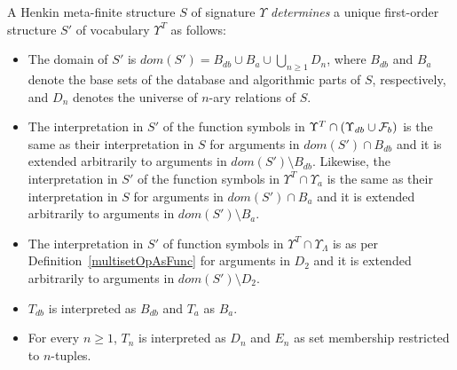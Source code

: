 \documentclass[preprint,11pt]{elsarticle}
\theoremstyle{definition}
\theoremstyle{remark}
\begin{document}
A Henkin meta-finite structure $S$ of signature $\Upsilon$ \emph{determines} a unique first-order structure $S'$ of vocabulary $\Upsilon^T$ as follows:

\begin{itemize}
\item The domain of $S'$ is $\mathit{dom}(S') = B_{db} \cup B_{a} \cup \bigcup_{n \geq 1} D_n$, where $B_{db}$ and $B_a$ denote the base sets of the database and algorithmic parts of $S$, respectively, and $D_n$ denotes the universe of $n$-ary relations of $S$. 
\item The interpretation in $S'$ of the function symbols in $\Upsilon^T \cap (\Upsilon_{db} \cup {\cal F}_b)$ is the same as their interpretation in $S$ for arguments in $\mathit{dom}(S') \cap B_{db}$ and it is extended arbitrarily to arguments in $\mathit{dom}(S') \setminus B_{db}$. Likewise, the interpretation in $S'$ of the function symbols in $\Upsilon^T \cap \Upsilon_{a}$ is the same as their interpretation in $S$ for arguments in $\mathit{dom}(S') \cap B_{a}$ and it is extended arbitrarily to arguments in $\mathit{dom}(S') \setminus B_{a}$.
\item The interpretation in $S'$ of function symbols in $\Upsilon^T \cap \Upsilon_\Lambda$ is as per Definition~\ref{multisetOpAsFunc} for arguments in $D_2$ and it is extended arbitrarily to arguments in $\mathit{dom}(S') \setminus D_2$. 
\item $T_{db}$ is interpreted as $B_{db}$ and $T_a$ as $B_{a}$.
\item For every $n \geq 1$, $T_n$ is interpreted as $D_n$ and $E_n$ as set membership restricted to $n$-tuples.
\end{itemize}
\end{document}
